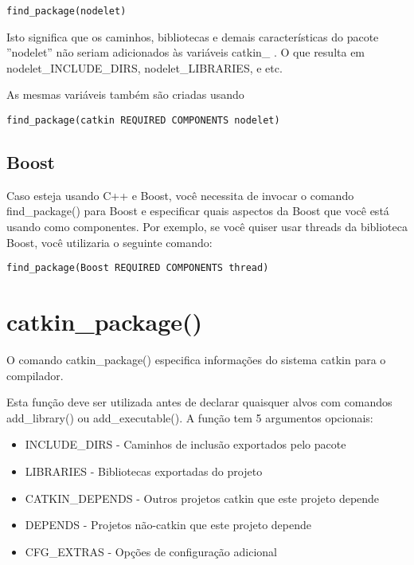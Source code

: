\begin{verbatim} 
find_package(nodelet)
\end{verbatim}

Isto significa que os caminhos, bibliotecas e demais características do pacote ''nodelet'' não seriam adicionados às variáveis catkin\_ . O que resulta em nodelet\_INCLUDE\_DIRS, nodelet\_LIBRARIES, e etc. 

As mesmas variáveis também são criadas usando

\begin{verbatim} 
find_package(catkin REQUIRED COMPONENTS nodelet)
\end{verbatim}

\subsection{Boost}

Caso esteja usando C++ e Boost, você necessita de invocar o comando find\_package() para Boost e especificar quais aspectos da Boost que você está usando como componentes. Por exemplo, se você quiser usar threads da biblioteca Boost, você utilizaria o seguinte comando:

\begin{verbatim} 
find_package(Boost REQUIRED COMPONENTS thread)
\end{verbatim}

\section{catkin\_package()}

O comando catkin\_package() especifica informações do sistema catkin para o compilador.

Esta função deve ser utilizada antes de declarar quaisquer alvos com comandos add\_library() ou add\_executable(). A função tem 5 argumentos opcionais:

\begin{itemize}
	\setlength{\itemsep}{1pt}
	\setlength{\parskip}{0pt}
	\setlength{\parsep}{0pt}
	\item[]INCLUDE\_DIRS - Caminhos de inclusão exportados pelo pacote
	\item[]LIBRARIES - Bibliotecas exportadas do projeto
	\item[]CATKIN\_DEPENDS - Outros projetos catkin que este projeto depende
	\item[]DEPENDS - Projetos não-catkin que este projeto depende
	\item[]CFG\_EXTRAS - Opções de configuração adicional
\end{itemize}

